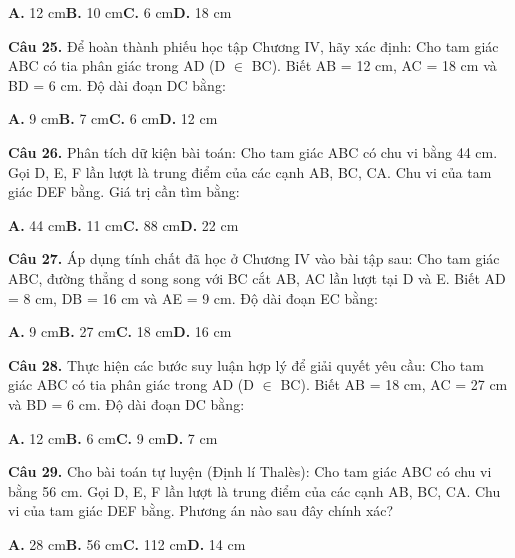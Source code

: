 \documentclass[11pt,a4paper]{article}
\begin{document}
\hspace*{1.5em}\textbf{A.} 12 cm\quad\quad \textbf{B.} 10 cm\quad\quad \textbf{C.} 6 cm\quad\quad \textbf{D.} 18 cm\par\vspace{2pt}
\textbf{\color{primary} Câu 25.} Để hoàn thành phiếu học tập Chương IV, hãy xác định: Cho tam giác ABC có tia phân giác trong AD (D $\in$ BC). Biết AB = 12 cm, AC = 18 cm và BD = 6 cm. Độ dài đoạn DC bằng:\par
\hspace*{1.5em}\textbf{A.} 9 cm\quad\quad \textbf{B.} 7 cm\quad\quad \textbf{C.} 6 cm\quad\quad \textbf{D.} 12 cm\par\vspace{2pt}
\textbf{\color{primary} Câu 26.} Phân tích dữ kiện bài toán: Cho tam giác ABC có chu vi bằng 44 cm. Gọi D, E, F lần lượt là trung điểm của các cạnh AB, BC, CA. Chu vi của tam giác DEF bằng. Giá trị cần tìm bằng:\par
\hspace*{1.5em}\textbf{A.} 44 cm\quad\quad \textbf{B.} 11 cm\quad\quad \textbf{C.} 88 cm\quad\quad \textbf{D.} 22 cm\par\vspace{2pt}
\textbf{\color{primary} Câu 27.} Áp dụng tính chất đã học ở Chương IV vào bài tập sau: Cho tam giác ABC, đường thẳng d song song với BC cắt AB, AC lần lượt tại D và E. Biết AD = 8 cm, DB = 16 cm và AE = 9 cm. Độ dài đoạn EC bằng:\par
\hspace*{1.5em}\textbf{A.} 9 cm\quad\quad \textbf{B.} 27 cm\quad\quad \textbf{C.} 18 cm\quad\quad \textbf{D.} 16 cm\par\vspace{2pt}
\textbf{\color{primary} Câu 28.} Thực hiện các bước suy luận hợp lý để giải quyết yêu cầu: Cho tam giác ABC có tia phân giác trong AD (D $\in$ BC). Biết AB = 18 cm, AC = 27 cm và BD = 6 cm. Độ dài đoạn DC bằng:\par
\hspace*{1.5em}\textbf{A.} 12 cm\quad\quad \textbf{B.} 6 cm\quad\quad \textbf{C.} 9 cm\quad\quad \textbf{D.} 7 cm\par\vspace{2pt}
\textbf{\color{primary} Câu 29.} Cho bài toán tự luyện (Định lí Thalès): Cho tam giác ABC có chu vi bằng 56 cm. Gọi D, E, F lần lượt là trung điểm của các cạnh AB, BC, CA. Chu vi của tam giác DEF bằng. Phương án nào sau đây chính xác?\par
\hspace*{1.5em}\textbf{A.} 28 cm\quad\quad \textbf{B.} 56 cm\quad\quad \textbf{C.} 112 cm\quad\quad \textbf{D.} 14 cm\par\vspace{2pt}
\end{document}

